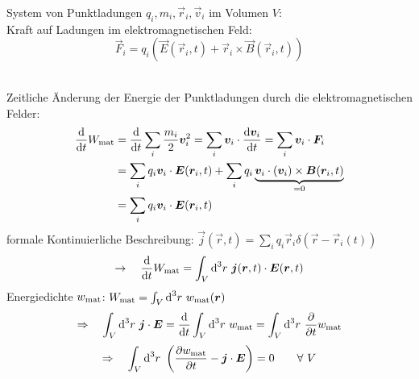 \begin{minipage}{.7\linewidth}
	System von Punktladungen $ q_i, m_i, \vec{r}_i, \vec{v}_i $ im Volumen $ V $:\\[5pt]
	Kraft auf Ladungen im elektromagnetischen Feld:
	\begin{equation*}
	\vec{F}_i = q_i \left(\vec{E}(\vec{r}_i, t) + \vec{r}_i \times \vec{B}(\vec{r}_i, t) \right)
	\end{equation*}
\end{minipage}%
\begin{minipage}{.3\linewidth}
	\centering
	\vspace{5pt}
\end{minipage}%
\\
Zeitliche Änderung der Energie der Punktladungen durch die elektromagnetischen Felder:
\begin{align*}
\frac{\textrm{d} }{\textrm{d} t} W_{\textrm{mat}} &= \frac{\textrm{d} }{\textrm{d} t} \sum_i \frac{m_i}{2} \bm{v}_i^2 = \sum_i \bm{v}_i \cdot \frac{\textrm{d} \bm{v}_i}{\textrm{d} t} = \sum_i \bm{v}_i \cdot \bm{F}_i\\
&= \sum_i q_i \bm{v}_i \cdot \bm{E}(\bm{r}_i, t) + \sum_i q_i \underbrace{ \bm{v}_i \cdot (\bm{v}_i) \times \bm{B}(\bm{r}_i, t) }_{=0}\\
&= \sum_i q_i \bm{v}_i \cdot \bm{E}(\bm{r}_i, t)
\end{align*}
formale Kontinuierliche Beschreibung: $ \vec{j}(\vec{r},t) = \sum_i q_i \vec{r}_i \delta(\vec{r} - \vec{r}_i(t)) $
\begin{equation*}
\rightarrow \quad \frac{\textrm{d} }{\textrm{d} t} W_{\textrm{mat}} = \int_V \textrm{d}^3 r \ \bm{j}(\bm{r},t) \cdot \bm{E}(\bm{r},t)
\end{equation*}
Energiedichte $ w_{\textrm{mat}} $: $ W_{\textrm{mat}} = \int_V \textrm{d}^3 r \ w_{\textrm{mat}} (\bm{r}) $
\begin{equation*}
\Rightarrow \quad \int_V \dd^3 r \ \vec{j} \cdot \vec{E} = \prd{}{t} \int_V \dd^3 r \ w_{\tx{mat}} = \int_V \dd^3 r \ \prt{}{t} w_{\tx{mat}}
\end{equation*}
\begin{equation*}
\Rightarrow \quad \int_V \dd^3 r \ \left(\prt{w_{\tx{mat}}}{t} - \vec{j} \cdot \vec{E} \right) = 0 \qquad \forall \ V
\end{equation*}
